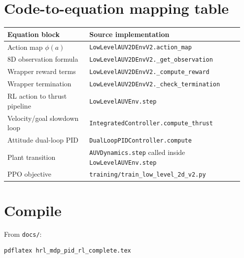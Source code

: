 \documentclass[11pt]{article}
\begin{document}
\section{Code-to-equation mapping table}
\begin{center}
\begin{tabular}{p{0.33\linewidth} p{0.62\linewidth}}
\toprule
Equation block & Source implementation \\
\midrule
Action map \(\phi(a)\) & \texttt{LowLevelAUV2DEnvV2.action\_map} \\
8D observation formula & \texttt{LowLevelAUV2DEnvV2.\_get\_observation} \\
Wrapper reward terms & \texttt{LowLevelAUV2DEnvV2.\_compute\_reward} \\
Wrapper termination & \texttt{LowLevelAUV2DEnvV2.\_check\_termination} \\
RL action to thrust pipeline & \texttt{LowLevelAUVEnv.step} \\
Velocity/goal slowdown loop & \texttt{IntegratedController.compute\_thrust} \\
Attitude dual-loop PID & \texttt{DualLoopPIDController.compute} \\
Plant transition & \texttt{AUVDynamics.step} called inside \texttt{LowLevelAUVEnv.step} \\
PPO objective & \texttt{training/train\_low\_level\_2d\_v2.py} \\
\bottomrule
\end{tabular}
\end{center}

\section*{Compile}
From \texttt{docs/}:
\begin{verbatim}
pdflatex hrl_mdp_pid_rl_complete.tex
\end{verbatim}
\end{document}
